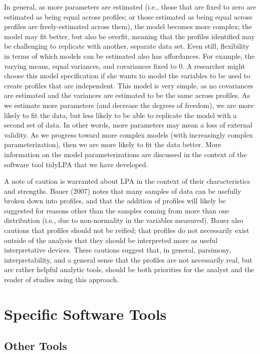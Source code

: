 \documentclass[man]{apa6}
\begin{document}
In general, as more parameters are estimated (i.e., those that are fixed to zero
are estimated as being equal across profiles; or those estimated as being equal
across profiles are freely-estimated across them), the model becomes more
complex; the model may fit better, but also be overfit, meaning that the
profiles identified may be challenging to replicate with another, separate data
set. Even still, flexibility in terms of which models can be estimated also has
affordances. For example, the varying means, equal variances, and covariances
fixed to 0. A researcher might choose this model specification if she wants to
model the variables to be used to create profiles that are independent. This
model is very simple, as no covariances are estimated and the variances are
estimated to be the same across profiles. As we estimate more parameters (and
decrease the degrees of freedom), we are more likely to fit the data, but less
likely to be able to replicate the model with a second set of data. In other
words, more parameters may mean a loss of external validity. As we progress
toward more complex models (with increasingly complex parameterization), then we
are more likely to fit the data better. More information on the model
parameterizations are discussed in the context of the software tool tidyLPA that
we have developed.

A note of caution is warranted about LPA in the context of their characteristics
and strengths. Bauer (2007) notes that many samples of data can be usefully
broken down into profiles, and that the addition of profiles will likely be
suggested for reasons other than the samples coming from more than one
distribution (i.e., due to non-normality in the variables measured). Bauer also
cautions that profiles should not be reified; that profiles do not necessarily
exist outside of the analysis that they should be interpreted more as useful
interpretative devices. These cautions suggest that, in general, parsimony,
interpretability, and a general sense that the profiles are not necessarily
real, but are rather helpful analytic tools, should be both priorities for the
analyst and the reader of studies using this approach.

\hypertarget{specific-software-tools}{%
\section{Specific Software Tools}\label{specific-software-tools}}

\hypertarget{other-tools}{%
\subsection{Other Tools}\label{other-tools}}
\end{document}
